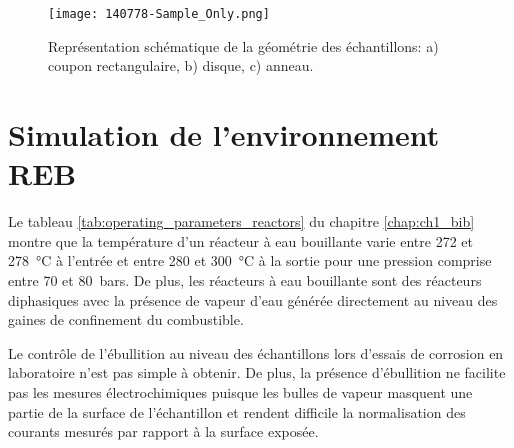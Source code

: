 \begin{refsection}

    \begin{figure}[H]
        \centering
        \texttt{[image: 140778-Sample\_Only.png]}
        \caption{Représentation schématique de la géométrie des échantillons: a) coupon rectangulaire, b) disque, c)
        anneau.}
        \label{fig:ch2_samples_schemes}
    \end{figure}


\section{Simulation de l'environnement REB}\label{sec:ch2_T_P}

    Le tableau \ref{tab:operating_parameters_reactors} du chapitre \ref{chap:ch1_bib} montre que la température d'un
    réacteur à eau bouillante varie entre 272 et \SI{278}{\degreeCelsius} à l'entrée et entre 280 et
    \SI{300}{\degreeCelsius} à la sortie pour une pression comprise entre 70 et 80~bars. De plus, les réacteurs à
    eau bouillante sont des réacteurs diphasiques avec la présence de vapeur d'eau générée directement au niveau des
    gaines de confinement du combustible. 

    Le contrôle de l'ébullition au niveau des échantillons lors d'essais de corrosion en laboratoire n'est pas simple
    à obtenir. De plus, la présence d'ébullition ne facilite pas les mesures électrochimiques puisque les bulles de
    vapeur masquent une partie de la surface de l'échantillon et rendent difficile la normalisation des courants mesurés par
    rapport à la surface exposée.


\end{refsection}
